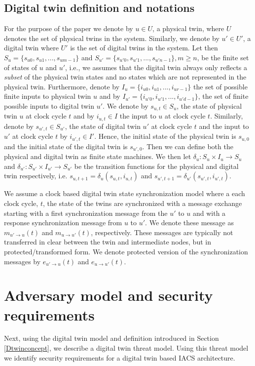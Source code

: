 \subsection{Digital twin definition and notations}
\label{Dtwinconcept:notations}
For the purpose of the paper we denote by $u \in U$, a physical twin, where $U$ denotes the set of physical twins in the system. Similarly, we denote by $u' \in U'$, a digital twin where $U'$ is the set of digital twins in the system.  Let then $S_u = \{s_{u0},s_{u1},...,s_{um-1}\}$ and $S_{u'} = \{s_{u'0},s_{u'1},...,s_{u'n-1}\}, m \geq n$, be the finite set of states of $u$ and $u'$, i.e., we assumes that the digital twin always only reflects a {\it subset} of the physical twin states and no states which are not represented in the physical twin.  Furthermore, denote by $I_u = \{i_{u0},i_{u1},...,i_{ur-1}\}$ the set of possible finite inputs to physical twin $u$ and by $I_{u'} = \{i_{u'0},i_{u'1},...,i_{u'd-1}\}$, the set of finite possible inputs to digital twin $u'$. We denote by $s_{u,t}\in S_u$,  the state of physical twin $u$ at clock cycle $t$ and by $i_{u,t}\in I$ the input to $u$ at clock cycle $t$. Similarly, denote by $s_{u',t} \in S_{u'}$,  the state of digital twin $u'$ at clock cycle $t$ and the input to $u'$ at clock cycle $t$ by $i_{u',t} \in I'$. Hence, the initial state of the physical twin is $s_{u,0}$ and the initial state of the digital twin is $s_{u',0}$. Then we can define both the physical and digital twin as finite state machines. We then let $\delta_u: S_u \times I_u \rightarrow S_u$ and $\delta_{u'}: S_{u'} \times I_{u'} \rightarrow S_{u'}$ be the transition functions for the physical and digital twin respectively, i.e. $s_{u,t+1} = \delta_u(s_{u,t},i_{u,t})$ and $s_{u',t+1} = \delta_{u'}(s_{u',t},i_{u',t})$. 

We assume a clock based digital twin state synchronization model where a each clock cycle, $t$, the state of the twins are synchronized with a message exchange starting with a first synchronization message from the $u'$ to $u$ and with a response synchronization message from  $u$ to $u'$. We denote these message as $m_{u'\rightarrow u}(t)$ and  $m_{u \rightarrow u'}(t)$, respectively. These messages are typically not transferred in clear between the twin and intermediate nodes, but in protected/transformed form. We denote protected version of the synchronization messages by $e_{u'\rightarrow u}(t)$ and  $e_{u \rightarrow u'}(t)$.

\section{Adversary model and security requirements}
\label{dtwinsecurity}
Next, using the digital twin model and definition introduced in Section \ref{Dtwinconcept}, we describe a digital twin threat model. Using this threat model we identify security requirements for a digital twin based IACS architecture.
\vspace*{-0.15in}

